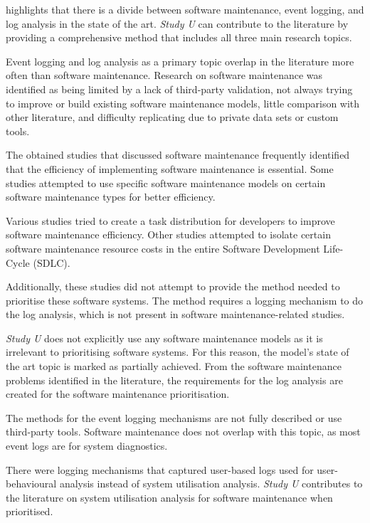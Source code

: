  highlights that there is a divide between software maintenance, event logging, and log analysis in the state of the art. \textit{Study U} can contribute to the literature by providing a comprehensive method that includes all three main research topics. \par Event logging and log analysis as a primary topic overlap in the literature more often than software maintenance. Research on software maintenance was identified as being limited by a lack of third-party validation, not always trying to improve or build existing software maintenance models, little comparison with other literature, and difficulty replicating due to private data sets or custom tools. \par The obtained studies that discussed software maintenance frequently identified that the efficiency of implementing software maintenance is essential. Some studies attempted to use specific software maintenance models on certain software maintenance types for better efficiency. \par Various studies tried to create a task distribution for developers to improve software maintenance efficiency. Other studies attempted to isolate certain software maintenance resource costs in the entire Software Development Life-Cycle (SDLC). \par Additionally, these studies did not attempt to provide the method needed to prioritise these software systems. The method requires a logging mechanism to do the log analysis, which is not present in software maintenance-related studies. \par \textit{Study U} does not explicitly use any software maintenance models as it is irrelevant to prioritising software systems. For this reason, the model's state of the art topic is marked as partially achieved. From the software maintenance problems identified in the literature, the requirements for the log analysis are created for the software maintenance prioritisation. \par The methods for the event logging mechanisms are not fully described or use third-party tools. Software maintenance does not overlap with this topic, as most event logs are for system diagnostics. \par There were logging mechanisms that captured user-based logs used for user-behavioural analysis instead of system utilisation analysis. \textit{Study U} contributes to the literature on system utilisation analysis for software maintenance when prioritised.

